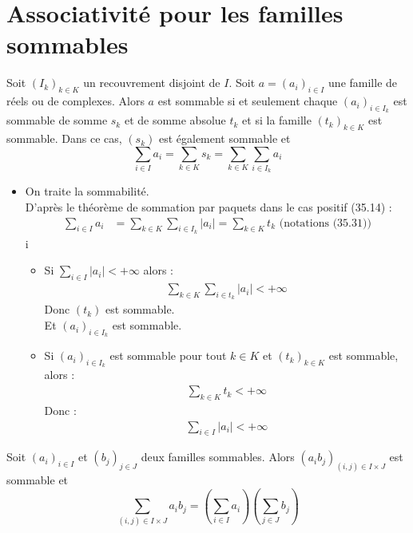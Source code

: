 \documentclass[../main.tex]{subfiles}
\begin{document}
\section{Associativité pour les familles sommables}
\begin{tcolorbox}[title=Théorème 35.31, title filled=false, colframe=orange, colback=orange!10!white]
    Soit $\left(I_k\right)_{k \in K}$ un recouvrement disjoint de $I$. Soit $a=\left(a_i\right)_{i \in I}$ une famille de réels ou de complexes. Alors $a$ est sommable si et seulement chaque $\left(a_i\right)_{i \in I_k}$ est sommable de somme $s_k$ et de somme absolue $t_k$ et si la famille $\left(t_k\right)_{k \in K}$ est sommable. Dans ce cas, $\left(s_k\right)$ est également sommable et
    $$\sum_{i \in I} a_i=\sum_{k \in K} s_k=\sum_{k \in K} \sum_{i \in I_k} a_i$$
\end{tcolorbox}

\begin{itemize}
    \item On traite la sommabilité. \\
    D'après le théorème de sommation par paquets dans le cas positif (35.14) : 
    \begin{align*}
        \sum_{i\in I} a_i &= \sum_{k\in K} \sum_{i\in I_k} |a_i| = \sum_{k\in K} t_k \text{ (notations (35.31))}
    \end{align*}i
    \begin{itemize}
        \item Si $\sum_{i\in I} |a_i| < +\infty$ alors : 
        \begin{align*}
            \sum_{k\in K}\sum_{i\in t_k} |a_i| < +\infty
        \end{align*}
        Donc $(t_k)$ est sommable. \\
        Et $(a_i)_{i\in I_k}$ est sommable. 
        \item Si $(a_i)_{i\in I_k}$ est sommable pour tout $k\in K$ et $(t_k)_{k\in K}$ est sommable, alors :
        \begin{align*}
            \sum_{k\in K} t_k < +\infty
        \end{align*}
        Donc : 
        \begin{align*}
            \sum_{i\in I} |a_i| < +\infty
        \end{align*}
    \end{itemize}
\end{itemize}

\begin{tcolorbox}[title=Théorème 35.33, title filled=false, colframe=orange, colback=orange!10!white]
    Soit $\left(a_i\right)_{i \in I}$ et $\left(b_j\right)_{j \in J}$ deux familles sommables. Alors $\left(a_i b_j\right)_{(i, j) \in I \times J}$ est sommable et
    $$\sum_{(i, j) \in I \times J} a_i b_j=\left(\sum_{i \in I} a_i\right)\left(\sum_{j \in J} b_j\right)$$
\end{tcolorbox}
\end{document}
